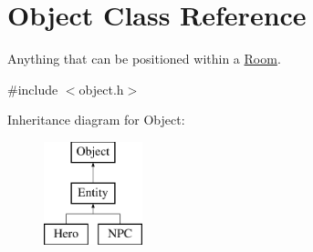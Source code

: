 \hypertarget{class_object}{\section{Object Class Reference}
\label{class_object}
}


Anything that can be positioned within a \hyperlink{class_room}{Room}.  




{\ttfamily \#include $<$object.\-h$>$}

Inheritance diagram for Object\-:\begin{figure}[H]
\begin{center}
\leavevmode
\includegraphics[height=3.000000cm]{class_object}
\end{center}
\end{figure}
